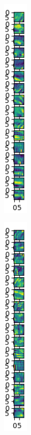 \documentclass[12pt]{article}
\begin{document}
\begin{figure}[h]
{\begin{subfigure}{1.3cm}
						\captionsetup{justification=centering,margin=.6cm}
					\end{subfigure}%
					\begin{subfigure}{1.3cm}
						\centering
						\includegraphics[width=1.3cm]{../Images/Feature_Maps_Cropped/image_4.png}
						\captionsetup{justification=centering,margin=1cm}
					\end{subfigure}%
					\begin{subfigure}{1.3cm}
						\centering
						\includegraphics[width=1.3cm]{../Images/Feature_Maps_Cropped/image_5.png}

\end{subfigure}}
\end{figure}
\end{document}
